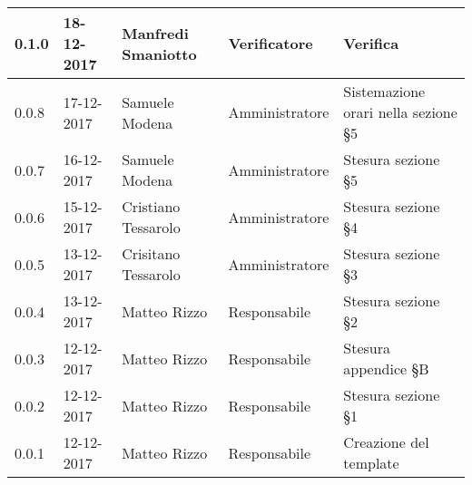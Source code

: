 \documentclass[./PianodiProgetto.tex]{subfiles}
\begin{document}
\begin{longtable}{|p{20mm}|p{20mm}|p{40mm}|p{30mm}|p{50mm}|}
		\hline 0.1.0 & 18-12-2017 & Manfredi Smaniotto & Verificatore & Verifica \\
 		
 		\hline 0.0.8 & 17-12-2017 & Samuele Modena & Amministratore & Sistemazione orari nella sezione §5 \\
 		
		\hline 0.0.7 & 16-12-2017 & Samuele Modena & Amministratore & Stesura sezione §5 \\
 
		\hline 0.0.6 & 15-12-2017 & Cristiano Tessarolo & Amministratore & Stesura sezione §4 \\
 
		\hline 0.0.5 & 13-12-2017 & Crisitano Tessarolo & Amministratore & Stesura sezione §3 \\
 
		\hline 0.0.4 & 13-12-2017 & Matteo Rizzo & Responsabile & Stesura sezione §2 \\
 
 		\hline 0.0.3 & 12-12-2017 & Matteo Rizzo & Responsabile & Stesura appendice §B \\
 		
		\hline 0.0.2 & 12-12-2017 & Matteo Rizzo & Responsabile & Stesura sezione §1 \\
 
 		\hline 0.0.1 & 12-12-2017 & Matteo Rizzo & Responsabile & Creazione del template \\
 
		\hline
 
	\end{longtable}
\end{document}
